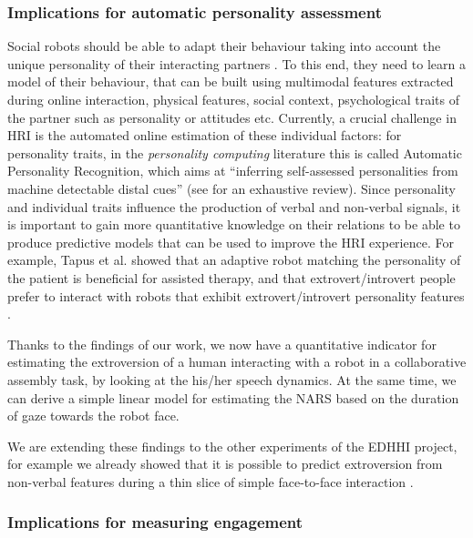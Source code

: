 \subsubsection{Implications for automatic personality assessment}


Social robots should be able to adapt their behaviour taking into account the unique personality of their interacting partners \cite{Anzalone2012profile}. To this end, they need to learn a model of their behaviour, that can be built using multimodal features extracted during online interaction, physical features, social context, psychological traits of the partner such as personality or attitudes etc.
Currently, a crucial challenge in HRI is the automated online estimation of these individual factors: for personality traits, in the \emph{personality computing} literature this is called Automatic Personality Recognition, which aims at ``inferring self-assessed personalities from machine detectable distal cues'' (see \cite{Vinciarelli14} for an exhaustive review).  
Since personality and individual traits influence the production of verbal and non-verbal signals, it is important to gain more quantitative knowledge on their relations to be able to produce predictive models that can be used to improve the HRI experience.
For example, Tapus et al. \cite{Tapus08,Tapus08b} showed that an adaptive robot matching the personality of the patient is beneficial for assisted therapy, and that extrovert/introvert people prefer to interact with robots that exhibit extrovert/introvert personality features \cite{Aly2013personality}. 

Thanks to the findings of our work, we now have a quantitative indicator for estimating the extroversion of a human interacting with a robot in a collaborative assembly task, by looking at the his/her speech dynamics. At the same time, we can derive a simple linear model for estimating the NARS based on the duration of gaze towards the robot face. 

We are extending these findings to the other experiments of the EDHHI project, for example we already showed that it is possible to predict extroversion from non-verbal features during a thin slice of simple face-to-face interaction \cite{ICSR2015}.




\subsubsection{Implications for measuring engagement}

